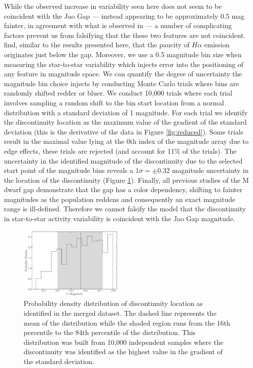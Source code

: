 While the observed increase in variability seen here does not seem to be
coincident with the Jao Gap --- instead appearing to be approximately 0.5 mag
fainter, in agreement with what is observed in \citet{Jao2023} --- a number of
complicating factors prevent us from falsifying that the these two features are
not coincident. \citeauthor{Jao2023} find, similar to the results presented
here, that the paucity of $H\alpha$ emission originates just below the gap.
Moreover, we use a 0.5 magnitude bin size when measuring the star-to-star
variability which injects error into the positioning of any feature in
magnitude space. We can quantify the degree of uncertainty the magnitude bin
choice injects by conducting Monte Carlo trials where bins are randomly shifted
redder or bluer. We conduct 10,000 trials where each trial involves sampling a
random shift to the bin start location from a normal distribution with a
standard deviation of 1 magnitude. For each trial we identify the discontinuity
location as the maximum value of the gradient of the standard deviation
(this is the derivative of the data in Figure \ref{fig:reduced}). Some trials
result in the maximal value lying at the 0th index of the magnitude array due
to edge effects, these trials are rejected (and account for 11\% of the
trials). The uncertainty in the identified magnitude of the discontinuity due
to the selected start point of the magnitude bins reveals a $1\sigma = \pm$0.32
magnitude uncertainty in the location of the discontinuity (Figure
\ref{fig:GapLocationMC}). Finally, all previous studies of the M dwarf gap
\citep{Jao2018, Feiden2022, Mansfield2021, Boudreaux2022, Jao2023} demonstrate
that the gap has a color dependency, shifting to fainter magnitudes as the
population reddens and consequently an exact magnitude range is ill-defined.
Therefore we cannot falsify the model that the discontinuity in star-to-star activity
variability is coincident with the Jao Gap magnitude.

\begin{figure}
  \centering
  \includegraphics[width=0.45\textwidth]{figures/GapLocationMC.pdf}
  \caption{Probability density distribution of discontinuity location as
  identified in the merged dataset. The dashed line represents the mean of the
  distribution while the shaded region runs from the 16th percentile to the
  84th percentile of the distribution. This distribution was built from 10,000
  independent samples where the discontinuity was identified as the highest
  value in the gradient of the standard deviation.}
  \label{fig:GapLocationMC}
\end{figure}

